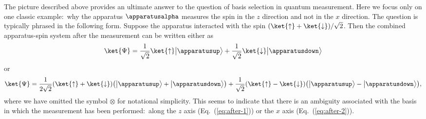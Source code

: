 \documentclass[12pt]{article}
\begin{document}
The picture described above provides an ultimate answer to the question of 
basis selection in quantum measurement.  Here we focus only on one classic 
example:\ why the apparatus $\apparatusalpha$ measures the spin in the 
$z$ direction and not in the $x$ direction.  The question is typically 
phrased in the following form.  Suppose the apparatus interacted with 
the spin $(\ket{\uparrow} + \ket{\downarrow})/\sqrt{2}$.  Then the 
combined apparatus-spin system after the measurement can be written 
either as
%
\begin{equation}
  \ket{\Psi} = 
  \frac{1}{\sqrt{2}} \ket{\uparrow} \bigl|\apparatusup\bigr> 
  + \frac{1}{\sqrt{2}} \ket{\downarrow} \bigl|\apparatusdown\bigr> 
\label{eq:after-1}
\end{equation}
%
or
%
\begin{equation}
  \ket{\Psi} = 
  \frac{1}{2\sqrt{2}} (\ket{\uparrow} + \ket{\downarrow}) 
    \bigl( \bigl|\apparatusup\bigr> + \bigl|\apparatusdown\bigr> \bigr) 
  + \frac{1}{\sqrt{2}} (\ket{\uparrow} - \ket{\downarrow}) 
    \bigl( \bigl|\apparatusup\bigr> - \bigl|\apparatusdown\bigr> \bigr),
\label{eq:after-2}
\end{equation}
%
where we have omitted the symbol $\otimes$ for notational simplicity. 
This seems to indicate that there is an ambiguity associated with the 
basis in which the measurement has been performed:\ along the $z$ axis 
(Eq.~(\ref{eq:after-1})) or the $x$ axis (Eq.~(\ref{eq:after-2})).
\end{document}
